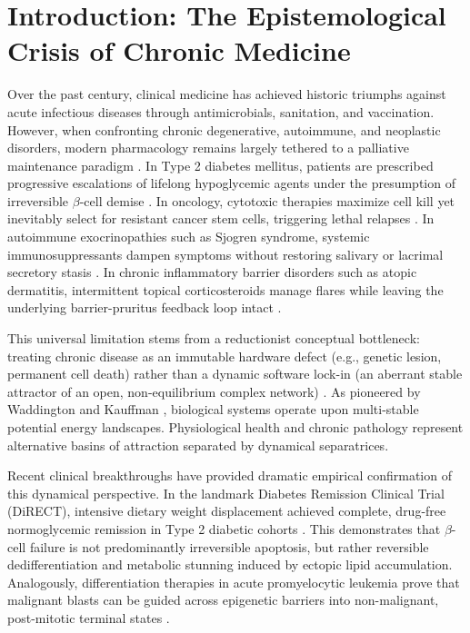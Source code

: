 \documentclass[11pt,a4paper]{article}
\begin{document}
\section{Introduction: The Epistemological Crisis of Chronic Medicine}

Over the past century, clinical medicine has achieved historic triumphs against acute infectious diseases through antimicrobials, sanitation, and vaccination. However, when confronting chronic degenerative, autoimmune, and neoplastic disorders, modern pharmacology remains largely tethered to a palliative maintenance paradigm \cite{Mozaffarian2016,Hunter2002}. In Type 2 diabetes mellitus, patients are prescribed progressive escalations of lifelong hypoglycemic agents under the presumption of irreversible $\beta$-cell demise \cite{Taylor2019}. In oncology, cytotoxic therapies maximize cell kill yet inevitably select for resistant cancer stem cells, triggering lethal relapses \cite{GoldieColdman1979,Gupta2019}. In autoimmune exocrinopathies such as Sjogren syndrome, systemic immunosuppressants dampen symptoms without restoring salivary or lacrimal secretory stasis \cite{BritoZeron2016}. In chronic inflammatory barrier disorders such as atopic dermatitis, intermittent topical corticosteroids manage flares while leaving the underlying barrier-pruritus feedback loop intact \cite{Langan2020}.

This universal limitation stems from a reductionist conceptual bottleneck: treating chronic disease as an immutable hardware defect (e.g., genetic lesion, permanent cell death) rather than a dynamic software lock-in (an aberrant stable attractor of an open, non-equilibrium complex network) \cite{Huang2009,Kitano2004}. As pioneered by Waddington \cite{Waddington1957} and Kauffman \cite{Kauffman1993}, biological systems operate upon multi-stable potential energy landscapes. Physiological health and chronic pathology represent alternative basins of attraction separated by dynamical separatrices. 

Recent clinical breakthroughs have provided dramatic empirical confirmation of this dynamical perspective. In the landmark Diabetes Remission Clinical Trial (DiRECT), intensive dietary weight displacement achieved complete, drug-free normoglycemic remission in Type 2 diabetic cohorts \cite{Lean2018,Taylor2021}. This demonstrates that $\beta$-cell failure is not predominantly irreversible apoptosis, but rather reversible dedifferentiation and metabolic stunning induced by ectopic lipid accumulation. Analogously, differentiation therapies in acute promyelocytic leukemia prove that malignant blasts can be guided across epigenetic barriers into non-malignant, post-mitotic terminal states \cite{Wang2008}.
\end{document}
